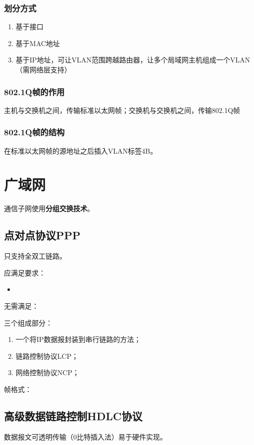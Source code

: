 \subsubsection{划分方式}
\begin{enumerate}
    \item 基于接口
    \item 基于MAC地址
    \item 基于IP地址，可让VLAN范围跨越路由器，让多个局域网主机组成一个VLAN（需网络层支持）
\end{enumerate}


\subsubsection{802.1Q帧的作用}
主机与交换机之间，传输标准以太网帧；交换机与交换机之间，传输802.1Q帧


\subsubsection{802.1Q帧的结构}
在标准以太网帧的源地址之后插入VLAN标签4B。


\section{广域网}

通信子网使用\textbf{分组交换技术}。

\subsection{点对点协议PPP}
只支持全双工链路。

应满足要求：\begin{itemize}
    \item 
\end{itemize}

无需满足：

三个组成部分：\begin{enumerate}
    \item 一个将IP数据报封装到串行链路的方法；
    \item 链路控制协议LCP；
    \item 网络控制协议NCP；
\end{enumerate}

帧格式：


\subsection{高级数据链路控制HDLC协议}
数据报文可透明传输（0比特插入法）易于硬件实现。

